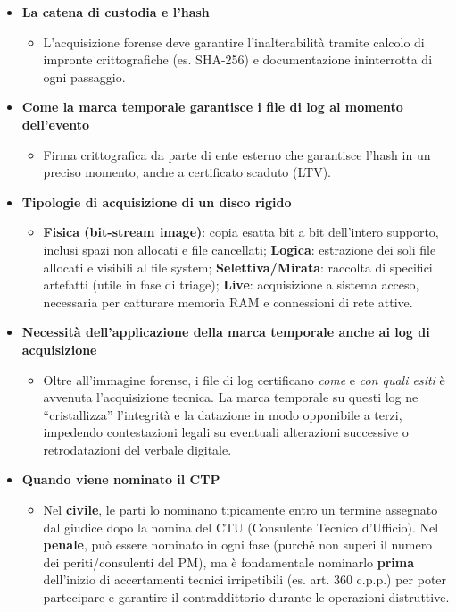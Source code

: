 \documentclass[11pt,a4paper]{article}
\begin{document}
\begin{itemize}
    \item \textbf{La catena di custodia e l'hash} 
    \begin{itemize}
        \item L'acquisizione forense deve garantire l'inalterabilità tramite calcolo di impronte crittografiche (es. SHA-256) e documentazione ininterrotta di ogni passaggio.
    \end{itemize}
    
    \item \textbf{Come la marca temporale garantisce i file di log al momento dell'evento} 
    \begin{itemize}
        \item Firma crittografica da parte di ente esterno che garantisce l'hash in un preciso momento, anche a certificato scaduto (LTV).
    \end{itemize}
    
    \item \textbf{Tipologie di acquisizione di un disco rigido} 
    \begin{itemize}
        \item \textbf{Fisica (bit-stream image)}: copia esatta bit a bit dell'intero supporto, inclusi spazi non allocati e file cancellati; \textbf{Logica}: estrazione dei soli file allocati e visibili al file system; \textbf{Selettiva/Mirata}: raccolta di specifici artefatti (utile in fase di triage); \textbf{Live}: acquisizione a sistema acceso, necessaria per catturare memoria RAM e connessioni di rete attive.
    \end{itemize}
    
    \item \textbf{Necessità dell'applicazione della marca temporale anche ai log di acquisizione} 
    \begin{itemize}
        \item Oltre all'immagine forense, i file di log certificano \textit{come} e \textit{con quali esiti} è avvenuta l'acquisizione tecnica. La marca temporale su questi log ne ``cristallizza'' l'integrità e la datazione in modo opponibile a terzi, impedendo contestazioni legali su eventuali alterazioni successive o retrodatazioni del verbale digitale.
    \end{itemize}
    
    \item \textbf{Quando viene nominato il CTP} 
    \begin{itemize}
        \item Nel \textbf{civile}, le parti lo nominano tipicamente entro un termine assegnato dal giudice dopo la nomina del CTU (Consulente Tecnico d'Ufficio). Nel \textbf{penale}, può essere nominato in ogni fase (purché non superi il numero dei periti/consulenti del PM), ma è fondamentale nominarlo \textbf{prima} dell'inizio di accertamenti tecnici irripetibili (es. art. 360 c.p.p.) per poter partecipare e garantire il contraddittorio durante le operazioni distruttive.
    \end{itemize}
    

\end{itemize}
\end{document}
